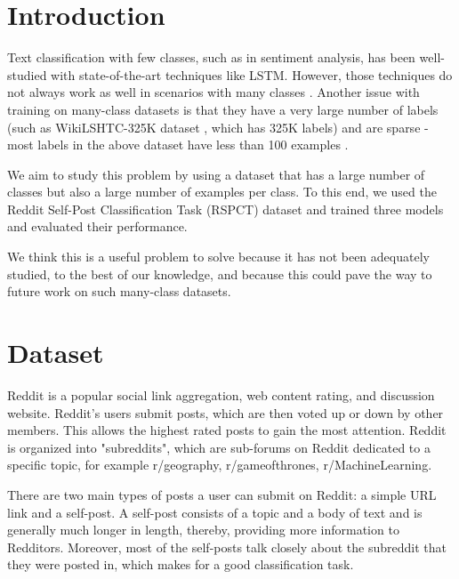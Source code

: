 \documentclass{sig-alternate-05-2015}
\begin{document}
%
%
\printccsdesc



\section{Introduction}

Text classification with few classes, such as in sentiment analysis, has been well-studied \cite{sentiment-analysis} with state-of-the-art techniques like LSTM. However, those techniques do not always work as well in scenarios with many classes \cite{many-classes}. Another issue with training on many-class datasets is that they have a very large number of labels (such as WikiLSHTC-325K dataset \cite{partalas2015lshtc}, which has 325K labels) and are sparse - most labels in the above dataset have less than 100 examples \cite{jonesreddit}.

We aim to study this problem by using a dataset that has a large number of classes but also a large number of examples per class. To this end, we used the Reddit Self-Post Classification Task (RSPCT) dataset and trained three models and evaluated their performance.

We think this is a useful problem to solve because it has not been adequately studied, to the best of our knowledge, and because this could pave the way to future work on such many-class datasets. 

\section{Dataset}

Reddit is a popular social link aggregation, web content rating, and discussion website. Reddit's users submit posts, which are then voted up or down by other members. This allows the highest rated posts to gain the most attention. Reddit is organized into "subreddits", which are sub-forums on Reddit dedicated to a specific topic, for example r/geography, r/gameofthrones, r/MachineLearning.

There are two main types of posts a user can submit on Reddit: a simple URL link and a self-post. A self-post consists of a topic and a body of text and is generally much longer in length, thereby, providing more information to Redditors. Moreover, most of the self-posts talk closely about the subreddit that they were posted in, which makes for a good classification task. 
\end{document}
